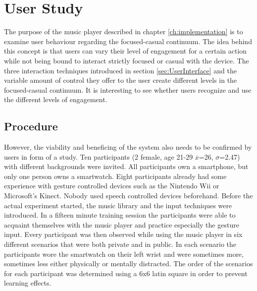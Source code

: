 \chapter{User Study}\label{ch:userStudy}

The purpose of the music player described in chapter \ref{ch:implementation} is to examine user behaviour regarding the focused-casual continuum. The idea behind this concept is that users can vary their level of engagement for a certain action while not being bound to interact strictly focused or casual with the device. The three interaction techniques introduced in section \ref{sec:UserInterface} and the variable amount of control they offer to the user create different levels in the focused-casual continuum. It is interesting to see whether users recognize and use the different levels of engagement. \\

\section{Procedure}\label{sec:studyProcedure}
However, the viability and beneficing of the system also needs to be confirmed by users in form of a study. Ten participants (2 female, age 21-29 $\overline{x}$=26, $\sigma$=2.47) with different backgrounds were invited. All participants own a smartphone, but only one person owns a smartwatch. Eight participants already had some experience with gesture controlled devices such as the Nintendo Wii or Microsoft's Kinect. Nobody used speech controlled devices beforehand. Before the actual experiment started, the music library and the input techniques were introduced. In a fifteen minute training session the participants were able to acquaint themselves with the music player and practice especially the gesture input. Every participant was then observed while using the music player in six different scenarios that were both private and in public. In each scenario the participants wore the smartwatch on their left wrist and were sometimes more, sometimes less either physically or mentally distracted. The order of the scenarios for each participant was determined using a 6x6 latin square in order to prevent learning effects. \\

